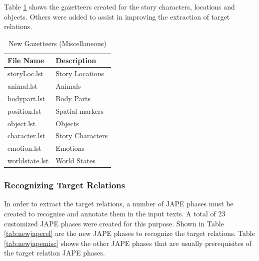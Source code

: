 Table \ref{tab:newgazetteersstory} shows the gazetteers created for the story characters, locations and objects. Others were added to assist in improving the extraction of target relations.

\begin{table}[H]   %
\centering
\caption{New Gazetteers (Miscellaneous)} \vspace{0.25em}
\begin{tabular}{|p{5cm}|p{5cm}|} \hline
File Name & Description \\ \hline
storyLoc.lst		& Story Locations \\ \hline
animal.lst			& Animals \\ \hline
bodypart.lst		& Body Parts \\ \hline
position.lst		& Spatial markers \\ \hline
object.lst			& Objects \\ \hline
character.lst		& Story Characters \\ \hline
emotion.lst			& Emotions \\ \hline
worldstate.lst 		& World States \\ \hline
\end{tabular}
\label{tab:newgazetteersstory}
\end{table}

\subsubsection{Recognizing Target Relations}
\label{sec:recogtarget}

In order to extract the target relations, a number of JAPE phases must be created to recognise and annotate them in the input texts. A total of 23 customized JAPE phases were created for this purpose. Shown in Table \ref{tab:newjaperel} are the new JAPE phases to recognize the target relations. Table \ref{tab:newjapemisc} shows the other JAPE phases that are usually prerequisites of the target relation JAPE phases.

